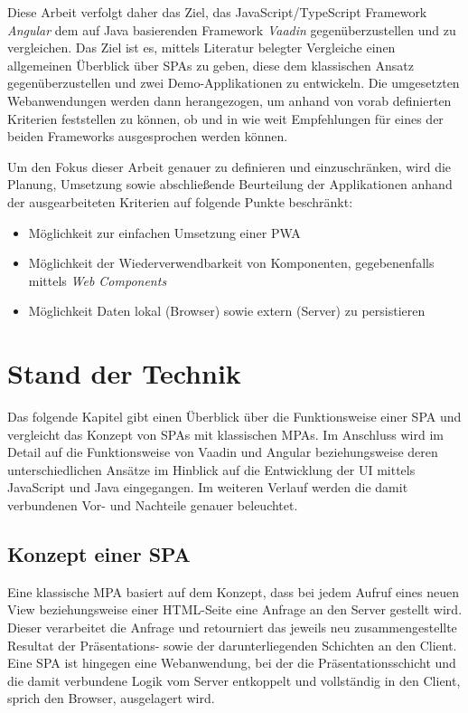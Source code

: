 \documentclass[a4paper,12pt,twoside]{scrreprt}
\begin{document}
\medskip

Diese Arbeit verfolgt daher das Ziel, das JavaScript/TypeScript Framework \textit{Angular} dem auf Java basierenden Framework \textit{Vaadin} gegenüberzustellen und zu vergleichen. Das Ziel ist es, mittels Literatur belegter Vergleiche einen allgemeinen Überblick über \acp{SPA} zu geben, diese dem klassischen Ansatz gegenüberzustellen und zwei Demo-Applikationen zu entwickeln. Die umgesetzten Webanwendungen werden dann herangezogen, um anhand von vorab definierten Kriterien feststellen zu können, ob und in wie weit Empfehlungen für eines der beiden Frameworks ausgesprochen werden können.

\medskip

Um den Fokus dieser Arbeit genauer zu definieren und einzuschränken, wird die Planung, Umsetzung sowie abschließende Beurteilung der Applikationen anhand der ausgearbeiteten Kriterien auf folgende Punkte beschränkt:
\begin{itemize}
    \item Möglichkeit zur einfachen Umsetzung einer \acf{PWA}
    \item Möglichkeit der Wiederverwendbarkeit von Komponenten, gegebenenfalls mittels \textit{Web Components}
    \item Möglichkeit Daten lokal (Browser) sowie extern (Server) zu persistieren
\end{itemize}

\chapter{Stand der Technik}
\label{chap:stand-technik}
Das folgende Kapitel gibt einen Überblick über die Funktionsweise einer \ac{SPA} und vergleicht das Konzept von \acsp{SPA} mit klassischen \acp{MPA}. Im Anschluss wird im Detail auf die Funktionsweise von Vaadin und Angular beziehungsweise deren unterschiedlichen Ansätze im Hinblick auf die Entwicklung der \acs{UI} mittels JavaScript und Java eingegangen. Im weiteren Verlauf werden die damit verbundenen Vor- und Nachteile genauer beleuchtet.

\section{Konzept einer \acs{SPA}}
\label{sec:konzept-spa}
Eine klassische \ac{MPA} basiert auf dem Konzept, dass bei jedem Aufruf eines neuen View beziehungsweise einer HTML-Seite eine Anfrage an den Server gestellt wird. Dieser verarbeitet die Anfrage und retourniert das jeweils neu zusammengestellte Resultat der Präsentations- sowie der darunterliegenden Schichten an den Client. Eine \ac{SPA} ist hingegen eine Webanwendung, bei der die Präsentationsschicht und die damit verbundene Logik vom Server entkoppelt und vollständig in den Client, sprich den Browser, ausgelagert wird. \parencite[][Seite 5ff.]{scott_spa_2015}
\end{document}
